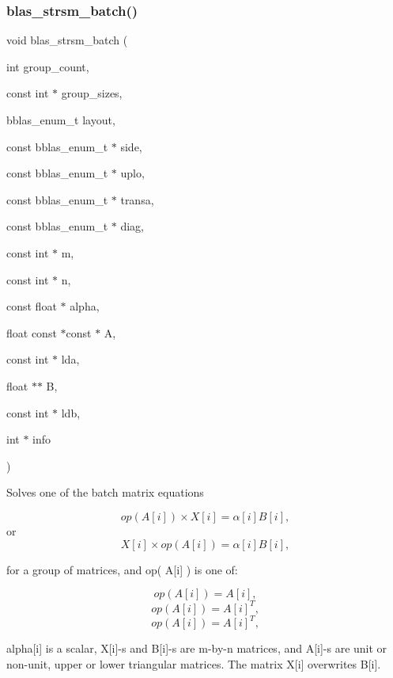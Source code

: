 \subsubsection{\texorpdfstring{blas\+\_\+strsm\+\_\+batch()}{blas\_strsm\_batch()}}
{\footnotesize\ttfamily void blas\+\_\+strsm\+\_\+batch (\begin{DoxyParamCaption}\item[{int}]{group\+\_\+count,  }\item[{const int $\ast$}]{group\+\_\+sizes,  }\item[{bblas\+\_\+enum\+\_\+t}]{layout,  }\item[{const bblas\+\_\+enum\+\_\+t $\ast$}]{side,  }\item[{const bblas\+\_\+enum\+\_\+t $\ast$}]{uplo,  }\item[{const bblas\+\_\+enum\+\_\+t $\ast$}]{transa,  }\item[{const bblas\+\_\+enum\+\_\+t $\ast$}]{diag,  }\item[{const int $\ast$}]{m,  }\item[{const int $\ast$}]{n,  }\item[{const float $\ast$}]{alpha,  }\item[{float const $\ast$const $\ast$}]{A,  }\item[{const int $\ast$}]{lda,  }\item[{float $\ast$$\ast$}]{B,  }\item[{const int $\ast$}]{ldb,  }\item[{int $\ast$}]{info }\end{DoxyParamCaption})}

Solves one of the batch matrix equations

\[ op( A[i] )\times X[i] = \alpha[i] B[i], \] or \[ X[i] \times op( A[i] ) = \alpha[i] B[i], \]

for a group of matrices, and op( A\mbox{[}i\mbox{]} ) is one of\+:

\[ op( A[i] ) = A[i], \] \[ op( A[i] ) = A[i]^T, \] \[ op( A[i] ) = A[i]^T, \]

alpha\mbox{[}i\mbox{]} is a scalar, X\mbox{[}i\mbox{]}-\/s and B\mbox{[}i\mbox{]}-\/s are m-\/by-\/n matrices, and A\mbox{[}i\mbox{]}-\/s are unit or non-\/unit, upper or lower triangular matrices. The matrix X\mbox{[}i\mbox{]} overwrites B\mbox{[}i\mbox{]}.


